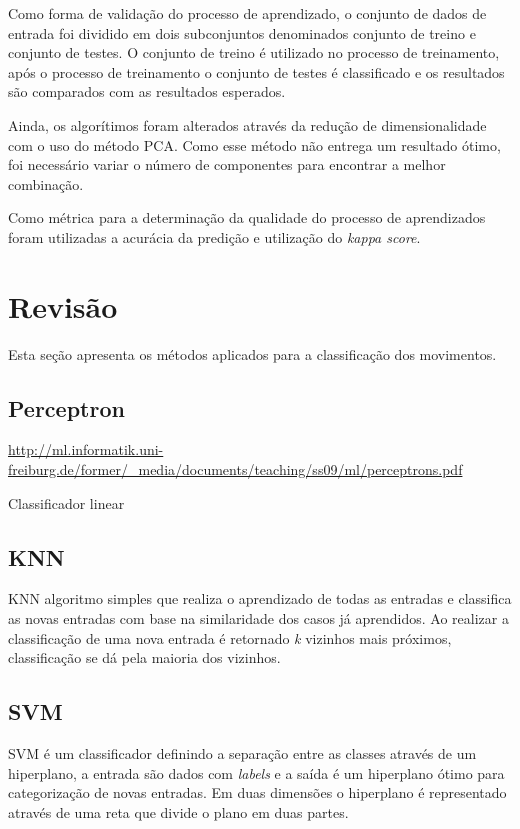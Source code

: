 \documentclass[12pt]{article}
\begin{document}
	Como forma de validação do processo de aprendizado, o conjunto de dados de entrada foi dividido em dois subconjuntos denominados conjunto de treino e conjunto de testes. O conjunto de treino é utilizado no processo de treinamento, após o processo de treinamento o conjunto de testes é classificado e os resultados são comparados com as resultados esperados.
	
	Ainda, os algorítimos foram alterados através da redução de dimensionalidade com o uso do método PCA. Como esse método não entrega um resultado ótimo, foi necessário variar o número de componentes para encontrar a melhor combinação.

	Como métrica para a determinação da qualidade do processo de aprendizados foram utilizadas a acurácia da predição e utilização do \emph{kappa score}. 

\section{Revisão}

	Esta seção apresenta os métodos aplicados para a classificação dos movimentos.

\subsection{Perceptron}

	\url{http://ml.informatik.uni-freiburg.de/former/_media/documents/teaching/ss09/ml/perceptrons.pdf}

	Classificador linear 
\subsection{KNN}

	KNN algoritmo simples que realiza o aprendizado de todas as entradas e classifica as novas entradas com base na similaridade dos casos já aprendidos. Ao realizar a classificação de uma nova entrada é retornado \emph{k} vizinhos mais próximos, classificação se dá pela maioria dos vizinhos.
	

\subsection{SVM}

	SVM é um classificador definindo a separação entre as classes através de um hiperplano, a entrada são dados com \emph{labels} e a saída é um hiperplano ótimo para categorização de novas entradas. Em duas dimensões o hiperplano é representado através de uma reta que divide o plano em duas partes.
	
\end{document}
